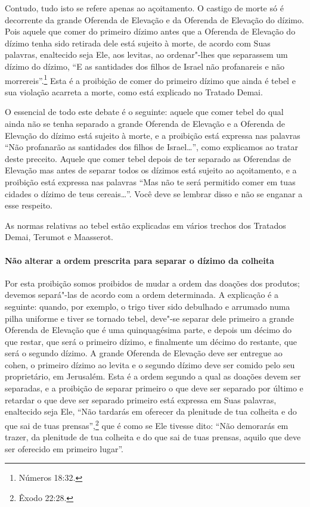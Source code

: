 \begin{multicols}{2}
Contudo, tudo isto se refere apenas ao açoitamento. O castigo de morte
só é decorrente da grande Oferenda de Elevação e da Oferenda de
Elevação do dízimo. Pois aquele que comer do primeiro dízimo antes que
a Oferenda de Elevação do dízimo tenha sido retirada dele está sujeito
à morte, de acordo com Suas palavras, enaltecido seja Ele, aos levitas\starr,
ao ordenar"-lhes que separassem um dízimo do dízimo, ``E as santidades
dos filhos de Israel não profanareis e não morrereis''.\footnote{Números 18:32.}
Esta é a proibição de comer do primeiro dízimo que ainda é tebel\starr{} e
sua violação acarreta a morte, como está explicado no Tratado Demai\starr.

O essencial de todo este debate é o seguinte: aquele que comer
tebel\starr{} do qual ainda não se tenha separado a grande Oferenda de
Elevação e a Oferenda de Elevação do dízimo está sujeito à morte, e a
proibição está expressa nas palavras ``Não profanarão as santidades dos
filhos de Israel\ldots{}'', como explicamos ao tratar deste preceito. Aquele
que comer tebel\starr{} depois de ter separado as Oferendas de Elevação mas
antes de separar todos os dízimos está sujeito ao açoitamento, e a
proibição está expressa nas palavras ``Mas não te será permitido comer
em tuas cidades o dízimo de teus cereais\ldots{}''. Você deve se lembrar
disso e não se enganar a esse respeito.

As normas relativas ao tebel\starr{} estão explicadas em vários trechos dos
Tratados Demai\starr, Terumot\starr{} e Maasserot\starr.

\paragraph{Não alterar a ordem prescrita para separar o dízimo da colheita}

Por esta proibição somos proibidos de mudar a ordem das doações dos
produtos; devemos separá"-las de acordo com a ordem determinada. A
explicação é a seguinte: quando, por exemplo, o trigo tiver sido
debulhado e arrumado numa pilha uniforme e tiver se tornado tebel\starr,
deve"-se separar dele primeiro a grande Oferenda de Elevação que é uma
quinquagésima parte, e depois um décimo do que restar, que será o
primeiro dízimo, e finalmente um décimo do restante, que será o segundo
dízimo. A grande Oferenda de Elevação deve ser entregue ao cohen\starr, o
primeiro dízimo ao levita\starr{} e o segundo dízimo deve ser comido pelo seu
proprietário, em Jerusalém. Esta é a ordem segundo a qual as doações
devem ser separadas, e a proibição de separar primeiro o que deve ser
separado por último e retardar o que deve ser separado primeiro está
expressa em Suas palavras, enaltecido seja Ele, ``Não tardarás em
oferecer da plenitude de tua colheita e do que sai de tuas prensas'',\footnote{Êxodo 22:28.} que é como se Ele tivesse dito: ``Não demorarás em
trazer, da plenitude de tua colheita e do que sai de tuas prensas, aquilo que deve ser oferecido em primeiro lugar''.


\end{multicols}
